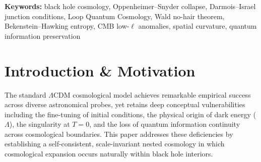 \documentclass[11pt,a4paper]{article}
\begin{document}
\textbf{Keywords:} black hole cosmology, Oppenheimer--Snyder collapse, Darmois--Israel junction conditions, Loop Quantum Cosmology, Wald no-hair theorem, Bekenstein--Hawking entropy, CMB low-$\ell$ anomalies, spatial curvature, quantum information preservation

\tableofcontents

\section{Introduction \& Motivation}\label{sec:intro}
The standard $\Lambda$CDM cosmological model achieves remarkable empirical success across diverse astronomical probes, yet retains deep conceptual vulnerabilities including the fine-tuning of initial conditions, the physical origin of dark energy ($\Lambda$), the singularity at $T=0$, and the loss of quantum information continuity across cosmological boundaries. This paper addresses these deficiencies by establishing a self-consistent, scale-invariant nested cosmology in which cosmological expansion occurs naturally within black hole interiors.
\end{document}
